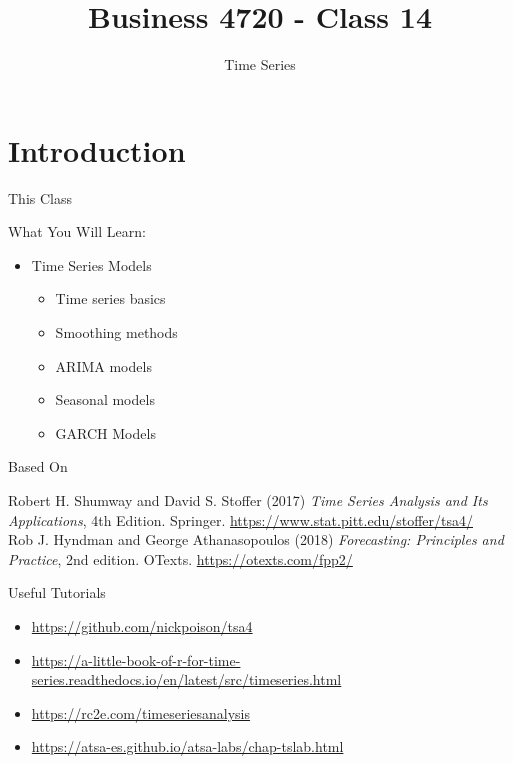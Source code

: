 \documentclass[ignorenonframetext,xcolor=x11names]{beamer}
\title{Business 4720 - Class 14}
\subtitle{Time Series}
\begin{document}
\begin{frame}[label=full]{}
  \titlepage
  \footnotesize
  
\end{frame}

\section{Introduction}

\begin{frame}[label=full]{This Class}

\begin{block}{What You Will Learn:}
\begin{itemize}
  \item Time Series Models
  \begin{itemize}
     \item Time series basics
     \item Smoothing methods
     \item ARIMA models
     \item Seasonal models
     \item GARCH Models
  \end{itemize}
\end{itemize}
\end{block}
\end{frame}


\begin{frame}[label=full]{Based On}
\small
\begin{block}{}
Robert H. Shumway and David S. Stoffer (2017) \emph{Time Series Analysis and Its Applications}, 4th Edition. Springer. \url{https://www.stat.pitt.edu/stoffer/tsa4/} \\

\vspace{\baselineskip}
Rob J. Hyndman and George Athanasopoulos (2018) \emph{Forecasting: Principles and Practice}, 2nd edition. OTexts. \url{https://otexts.com/fpp2/} 
\end{block}

\begin{block}{Useful Tutorials}
\begin{itemize}
\item \url{https://github.com/nickpoison/tsa4}
\item \url{https://a-little-book-of-r-for-time-series.readthedocs.io/en/latest/src/timeseries.html}
\item \url{https://rc2e.com/timeseriesanalysis}
\item \url{https://atsa-es.github.io/atsa-labs/chap-tslab.html}
\end{itemize}
\end{block}

\end{frame}
\end{document}
